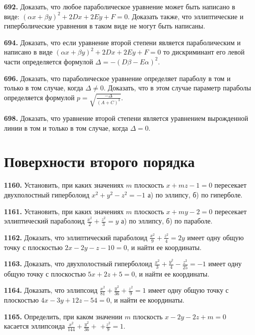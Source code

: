 \textbf{692.} Доказать, что любое параболическое уравнение может быть написано в виде: $(\alpha x+\beta y)^2+2 D x+2 E y+F=0$. Доказать также, что эллиптические и гиперболические уравнения в таком виде не могут быть написаны.

\textbf{694.} Доказать, что если уравнение второй степени является параболическим и написано в виде $(\alpha x+\beta y)^2+2 D x+2 E y+F=0$ то дискриминант его левой части определяется формулой $\Delta=-(D \beta-E \alpha)^2$.

\textbf{696.} Доказать, что параболическое уравнение определяет параболу в том и только в том случае, когда $\Delta \neq 0$. Доказать, что в этом случае параметр параболы определяется формулой $p=\sqrt{\frac{-\Delta}{(A+C)^3}}$.

\textbf{698.} Доказать, что уравнение второй степени является уравнением вырожденной линии в том и только в том случае, когда $\Delta=0$.



\section{Поверхности второго порядка}



\textbf{1160.} Установить, при каких значениях $m$ плоскость $x+m z-1=0$ пересекает двухполостный гиперболоид $x^2+y^2-z^2=-1$ а) по эллипсу, б) по гиперболе.

\textbf{1161.} Установить, при каких значениях $m$ плоскость $x+m y-2=0$ пересекает эллиптический параболоид $\frac{x^2}{2}+\frac{z^2}{3}=y$ а) по эллипсу, б) по параболе.

\textbf{1162.} Доказать, что эллиптический параболоид $\frac{x^2}{9}+\frac{z^2}{4}=2 y$ имеет одну общую точку с плоскостью $2 x-2 y-z-10=0$, и найти ее координаты.

\textbf{1163.} Доказать, что двухполостный гиперболоид $\frac{x^2}{3}+\frac{y^2}{4}-\frac{z^2}{25}=-1$ имеет одну общую точку с плоскостью $5 x+2 z+5=0$, и найти ее координаты.

\textbf{1164.} Доказать, что эллипсоид $\frac{x^2}{81}+\frac{y^2}{36}+\frac{z^2}{9}=1$ имеет одну общую точку с плоскостью $4 x-3 y+12 z-54=0$, и найти ее координаты.

\textbf{1165.} Определить, при каком значении $m$ плоскость $x-2 y-2 z+m=0$ касается эллипсоида $\frac{x^2}{144}+\frac{y^2}{36}+$ $+\frac{z^2}{9}=1$.